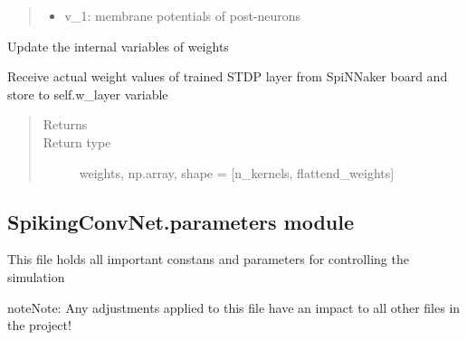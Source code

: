 \documentclass[letterpaper,10pt,english]{sphinxmanual}
\begin{document}
\begin{fulllineitems}
\begin{fulllineitems}
\begin{quote}
\begin{description}
\begin{itemize}
\begin{itemize}
\item {} 
v\_1: membrane potentials of post-neurons

\end{itemize}

\end{itemize}


\end{description}\end{quote}

\end{fulllineitems}


\begin{fulllineitems}
\label{\detokenize{SpikingConvNet:SpikingConvNet.classes.Spinnaker_Network.update_kernel_weights}}
Update the internal variables of weights

Receive actual weight values of trained STDP layer from SpiNNaker
board and store to self.w\_layer variable
\begin{quote}\begin{description}
\item[{Returns}] \leavevmode


\item[{Return type}] \leavevmode
weights, np.array, shape = {[}n\_kernels, flattend\_weights{]}

\end{description}\end{quote}

\end{fulllineitems}


\end{fulllineitems}



\subsection{SpikingConvNet.parameters module}
\label{\detokenize{SpikingConvNet:spikingconvnet-parameters-module}}\label{\detokenize{SpikingConvNet:module-SpikingConvNet.parameters}}
This file holds all important constans and parameters for controlling the
simulation

\begin{sphinxadmonition}{note}{Note:}
Any adjustments applied to this file have an impact to all other files in
the project!
\end{sphinxadmonition}
\end{document}
